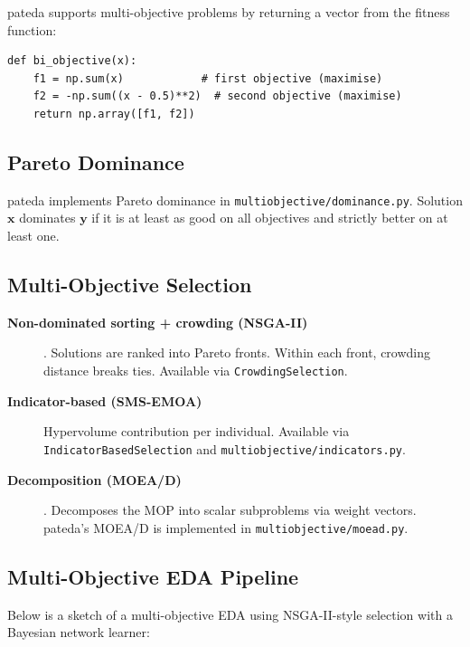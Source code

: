 \documentclass[a4paper,11pt]{article}
\begin{document}
pateda supports multi-objective problems by returning a vector from the fitness
function:

\begin{lstlisting}
def bi_objective(x):
    f1 = np.sum(x)            # first objective (maximise)
    f2 = -np.sum((x - 0.5)**2)  # second objective (maximise)
    return np.array([f1, f2])
\end{lstlisting}

\subsection{Pareto Dominance}

pateda implements Pareto dominance in \texttt{multiobjective/dominance.py}.
Solution $\mathbf{x}$ dominates $\mathbf{y}$ if it is at least as good on
all objectives and strictly better on at least one.

\subsection{Multi-Objective Selection}

\begin{description}
  \item[\textbf{Non-dominated sorting + crowding (NSGA-II)}]
    \citep{Deb_et_al:2002a}.
    Solutions are ranked into Pareto fronts.  Within each front, crowding
    distance breaks ties.  Available via \texttt{CrowdingSelection}.

  \item[\textbf{Indicator-based (SMS-EMOA)}]
    Hypervolume contribution per individual.  Available via
    \texttt{IndicatorBasedSelection} and \texttt{multiobjective/indicators.py}.

  \item[\textbf{Decomposition (MOEA/D)}] \citep{Muhlenbein_et_al:1999}.
    Decomposes the MOP into scalar subproblems via weight vectors.
    pateda's MOEA/D is implemented in \texttt{multiobjective/moead.py}.
\end{description}

\subsection{Multi-Objective EDA Pipeline}

Below is a sketch of a multi-objective EDA using NSGA-II-style selection with
a Bayesian network learner:
\end{document}
